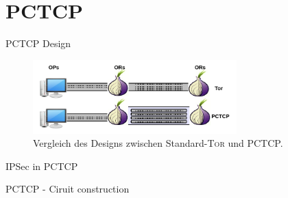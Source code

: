 \documentclass{beamer}
\begin{document}
\section{PCTCP}


\begin{frame}{PCTCP Design}
  \begin{figure}
    \begin{center}
      \includegraphics[width=0.7\textwidth]{pics/PCTCP_design.pdf}
      \caption{Vergleich des Designs zwischen Standard-\textsc{Tor} und PCTCP.}
    \end{center}
  \end{figure} 
\end{frame}


\begin{frame}{IPSec in PCTCP}
  \begin{figure}[h]
  \end{figure} 
\end{frame}


\begin{frame}{PCTCP - Ciruit construction}
\end{frame}




\end{document}
